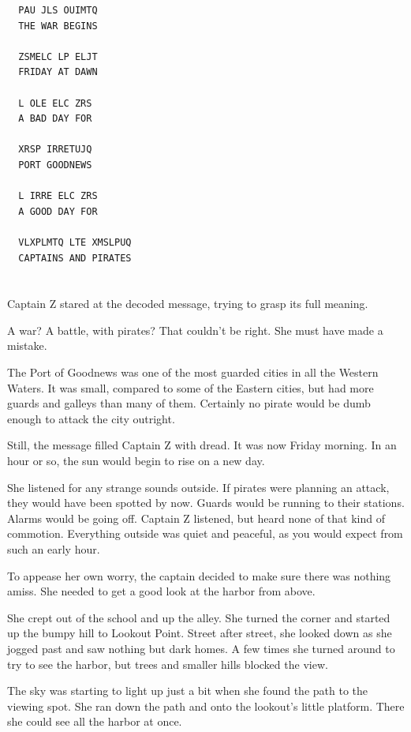 \documentclass[12pt]{extbook}
\begin{document}
  \begin{lstlisting}
  PAU JLS OUIMTQ
  THE WAR BEGINS
  
  ZSMELC LP ELJT
  FRIDAY AT DAWN
  
  L OLE ELC ZRS
  A BAD DAY FOR
  
  XRSP IRRETUJQ
  PORT GOODNEWS
  
  L IRRE ELC ZRS
  A GOOD DAY FOR
  
  VLXPLMTQ LTE XMSLPUQ
  CAPTAINS AND PIRATES
  \end{lstlisting}
  
  \section{}\label{section-32}
  
  Captain Z stared at the decoded message, trying to grasp its full
  meaning.
  
  A war? A battle, with pirates? That couldn't be right. She must have
  made a mistake.
  
  The Port of Goodnews was one of the most guarded cities in all the
  Western Waters. It was small, compared to some of the Eastern cities,
  but had more guards and galleys than many of them. Certainly no pirate
  would be dumb enough to attack the city outright.
  
  Still, the message filled Captain Z with dread. It was now Friday
  morning. In an hour or so, the sun would begin to rise on a new day.
  
  She listened for any strange sounds outside. If pirates were planning an
  attack, they would have been spotted by now. Guards would be running to
  their stations. Alarms would be going off. Captain Z listened, but heard
  none of that kind of commotion. Everything outside was quiet and
  peaceful, as you would expect from such an early hour.
  
  To appease her own worry, the captain decided to make sure there was
  nothing amiss. She needed to get a good look at the harbor from above.
  
  She crept out of the school and up the alley. She turned the corner and
  started up the bumpy hill to Lookout Point. Street after street, she
  looked down as she jogged past and saw nothing but dark homes. A few
  times she turned around to try to see the harbor, but trees and smaller
  hills blocked the view.
  
  The sky was starting to light up just a bit when she found the path to
  the viewing spot. She ran down the path and onto the lookout's little
  platform. There she could see all the harbor at once.
  
\end{document}
